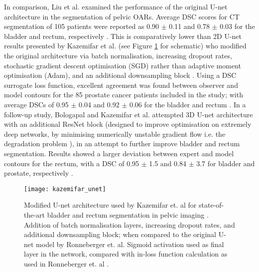 In comparison, Liu et al. examined the performance of the original U-net architecture in the segmentation of pelvic OARs. Average DSC scores for CT segmentation of 105 patients were reported as 0.90 $\pm$ 0.11 and 0.78 $\pm$ 0.03 for the bladder and rectum, respectively \cite{Liu_2020}. This is comparatively lower than 2D U-net results presented by Kazemifar et al. (see Figure \ref{fig:kazemifar_unet} for schematic) who modified the original architecture via batch normalisation, increasing dropout rates, stochastic gradient descent optimisation (SGD) rather than adaptive moment optimisation (Adam), and an additional downsampling block \cite{Kazemifar_2018}. Using a DSC surrogate loss function, excellent agreement was found between observer and model contours for the 85 prostate cancer patients included in the study; with average DSCs of 0.95 $\pm$ 0.04 and 0.92 $\pm$ 0.06 for the bladder and rectum \cite{Kazemifar_2018}. In a follow-up study, Bologapal and Kazemifar et al. attempted 3D U-net architecture with an additional ResNet block (designed to improve optimisation on extremely deep networks, by minimising numerically unstable gradient flow \cite{Maier2019} i.e. the degradation problem \cite{He2015deep}), in an attempt to further improve bladder and rectum segmentation. Results showed a larger deviation between expert and model contours for the rectum, with a DSC of 0.95 $\pm$ 1.5 and 0.84 $\pm$ 3.7 for bladder and prostate, respectively \cite{Balagopal_2018}. 

\begin{figure}
	\begin{center}
		\texttt{[image: kazemifar\_unet]}
		\caption{Modified U-net architecture used by Kazemifar et. al for state-of-the-art bladder and rectum segmentation in pelvic imaging \cite{Kazemifar_2018}. Addition of batch normalisation layers, increasing dropout rates, and additional downsampling block; when compared to the original U-net model by Ronneberger et. al. Sigmoid activation used as final layer in the network, compared with in-loss function calculation as used in Ronneberger et. al \cite{Ronneberger_2015}.}
		\label{fig:kazemifar_unet}
	\end{center}
\end{figure}

